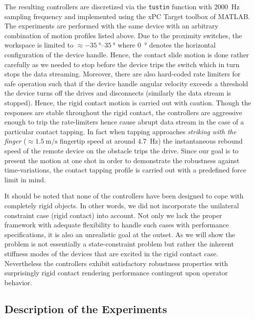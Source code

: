 The resulting controllers are discretized via the \texttt{tustin} function with \SI{2000}{\hertz} sampling frequency and implemented using the xPC 
Target toolbox of MATLAB. The experiments are performed with the same device with an arbitrary combination of motion profiles listed above. 
Due to the proximity switches, the workspace is limited to $\approx \SIrange{-35}{35}{\degree}$ where \SI{0}{\degree} denotes the horizontal 
configuration of the device handle. Hence, the contact slide motion is done rather carefully as we needed to stop before the device trips
the switch which in turn stops the data streaming. Moreover, there are also hard-coded rate limiters for safe operation such that if the 
device handle angular velocity exceeds a threshold the device turns off the drives and disconnects (similarly the data stream is stopped). 
Hence, the rigid contact motion is carried out with caution. Though the responses are stable throughout the rigid contact, the controllers are
aggressive enough to trip the rate-limiters hence cause abrupt data stream in the case of a particular contact tapping. In fact when tapping 
approaches \emph{striking with the finger} ($\approx \SI{1.5}{\meter\per\second}$ fingertip speed at around \SI{4.7}{\hertz}) the instantaneous
rebound speed of the remote device on the obstacle trips the drive. Since our goal is to present the motion at one shot in order to demonstrate 
the robustness against time-variations, the contact tapping profile is carried out with a predefined force limit in mind. 


It should be noted that none of the controllers have been designed to cope with completely rigid objects. In other words, we did not 
incorporate the unilateral constraint case (rigid contact) into account. Not only we lack the proper framework with adequate flexibility to handle such 
cases with performance specifications, it is also an unrealistic goal at the outset. As we will show the problem is not essentially a state-constraint problem but 
rather the inherent stiffness modes of the devices that are excited in the rigid contact case. Nevertheless the controllers exhibit satisfactory 
robustness properties with surprisingly rigid contact rendering performance contingent upon operator behavior.  

\subsection{Description of the Experiments}

